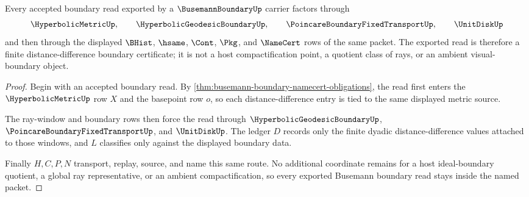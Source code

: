 \begin{theorem}
\label{thm:busemann-boundary-nonescape-boundary}
Every accepted boundary read exported by a $\BusemannBoundaryUp$ carrier factors through
$$
\HyperbolicMetricUp,\qquad
\HyperbolicGeodesicBoundaryUp,\qquad
\PoincareBoundaryFixedTransportUp,\qquad
\UnitDiskUp
$$
and then through the displayed $\BHist$, $\hsame$, $\Cont$, $\Pkg$, and $\NameCert$ rows of the same packet. The exported read is therefore a finite distance-difference boundary certificate; it is not a host compactification point, a quotient class of rays, or an ambient visual-boundary object.
\end{theorem}
\begin{proof}
Begin with an accepted boundary read. By \autoref{thm:busemann-boundary-namecert-obligations}, the read first enters the $\HyperbolicMetricUp$ row $X$ and the basepoint row $o$, so each distance-difference entry is tied to the same displayed metric source.

The ray-window and boundary rows then force the read through $\HyperbolicGeodesicBoundaryUp$, $\PoincareBoundaryFixedTransportUp$, and $\UnitDiskUp$. The ledger $D$ records only the finite dyadic distance-difference values attached to those windows, and $L$ classifies only against the displayed boundary data.

Finally $H,C,P,N$ transport, replay, source, and name this same route. No additional coordinate remains for a host ideal-boundary quotient, a global ray representative, or an ambient compactification, so every exported Busemann boundary read stays inside the named packet.
\end{proof}


\begin{closurestatus}{\BusemannBoundaryUp}
  \theoryclosure{\seedClosure}
  \formalstatus{\unformalizedV}
\end{closurestatus}
